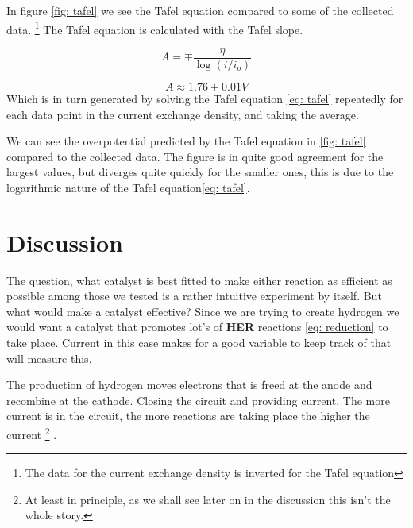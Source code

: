 \documentclass[twocolumn]{revtex4-2}
\begin{document}
In figure \ref{fig: tafel} we see the Tafel equation compared to some of the collected data.
\footnote{The data for the current exchange density is inverted for the Tafel equation} The
Tafel equation is calculated with the Tafel slope.

\begin{equation}
	 A = \mp\frac{\eta}{\log{(i/i_o)}} 
\end{equation}


\begin{equation}
	A \approx 1.76 \pm 0.01 V
	\label{eq: tafel_slope}
\end{equation}
Which is in turn generated by solving the Tafel equation \ref{eq: tafel} repeatedly for each
data point in the current exchange density, and taking the average.

We can see the overpotential predicted by the Tafel equation in \ref{fig: tafel} compared
to the collected data. The figure is in quite good agreement for the largest values, but diverges
quite quickly for the smaller ones, this is due to the logarithmic nature of the Tafel equation\ref{eq: tafel}.


\section{Discussion} 

The question, what catalyst is best fitted to make either reaction as efficient as 
possible among those we tested is a rather intuitive experiment by itself. But what 
would make a catalyst effective? Since we are trying to create hydrogen we would want a 
catalyst that promotes lot's of \textbf{HER} reactions \ref{eq: reduction} to take place. Current
in this case makes for a good variable to keep track of that will measure this. 
\par 
The production of hydrogen moves electrons that is freed at the anode and recombine
at the cathode. Closing the circuit and providing current. The more current is in the 
circuit, the more reactions are taking place the higher the current
\footnote{At least in principle, as we shall see later on in the discussion this isn't 
the whole story.}
.
\end{document}
